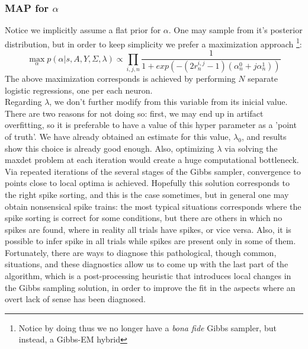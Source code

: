 \documentclass[12pt,letterpaper,fleqn]{article}
\begin{document}
\subsubsection{MAP for $\alpha$}
Notice we implicitly assume a flat prior for $\alpha$. One may sample from it's posterior distribution, but in order to keep simplicity we prefer a maximization approach \footnote{Notice by doing thus we no longer have a \textit{bona fide} Gibbs sampler, but instead, a Gibbs-EM hybrid}:
$$\max_{\alpha} p(\alpha|s,A,Y,\Sigma,\lambda)\propto \prod_{i,j,n}\frac{1}{1+exp\left(-(2r_n^{i,j}-1)(\alpha_n^0+j\alpha_n^1)\right)}$$
The above maximization corresponds is achieved by performing $N$ separate logistic regressions, one per each neuron.
\\
Regarding $\lambda$, we don't further modify from this variable from its inicial value. There are two reasons for not doing so: first, we may end up in artifact overfitting, so it is preferable to have a value of this hyper parameter as a 'point of truth'. We have already obtained an estimate for this value, $\lambda_0$, and results show this choice is already good enough. Also, optimizing  $\lambda$ via solving the maxdet problem at each iteration would create a huge computational bottleneck. \\
Via repeated iterations of the several stages of the Gibbs sampler, convergence to points close to local optima is achieved. Hopefully this solution corresponds to the right spike sorting, and this is the case sometimes, but in general one may obtain nonsensical spike trains: the most typical situations corresponds where the spike sorting is correct for some conditions, but there are others in which no spikes are found, where in reality all trials have spikes, or vice versa. Also, it is possible to infer spike in all trials while spikes are present only in some of them. Fortunately, there are ways to diagnose this pathological, though common, situations, and these diagnostics allow us to come up with the last part of the algorithm, which is a post-processing heuristic that introduces local changes in the Gibbs sampling solution, in order to improve the fit in the aspects where an overt lack of sense has been diagnosed.
\end{document}
